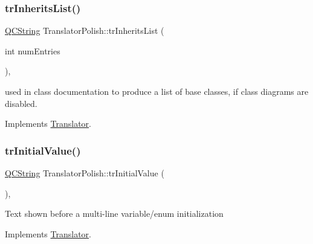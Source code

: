 \mbox{\label{class_translator_polish_a46060df2c96f771844d1228b29d893ce}} 
\subsubsection{\texorpdfstring{trInheritsList()}{trInheritsList()}}
{\footnotesize\ttfamily \mbox{\hyperlink{class_q_c_string}{Q\+C\+String}} Translator\+Polish\+::tr\+Inherits\+List (\begin{DoxyParamCaption}\item[{int}]{num\+Entries }\end{DoxyParamCaption})\hspace{0.3cm}{\ttfamily [inline]}, {\ttfamily [virtual]}}

used in class documentation to produce a list of base classes, if class diagrams are disabled. 

Implements \mbox{\hyperlink{class_translator}{Translator}}.

\mbox{\label{class_translator_polish_a675ae7842337be7efe61808e8a079ce8}} 
\subsubsection{\texorpdfstring{trInitialValue()}{trInitialValue()}}
{\footnotesize\ttfamily \mbox{\hyperlink{class_q_c_string}{Q\+C\+String}} Translator\+Polish\+::tr\+Initial\+Value (\begin{DoxyParamCaption}{ }\end{DoxyParamCaption})\hspace{0.3cm}{\ttfamily [inline]}, {\ttfamily [virtual]}}

Text shown before a multi-\/line variable/enum initialization 

Implements \mbox{\hyperlink{class_translator}{Translator}}.

\mbox{\label{class_translator_polish_a9e7ec9037ad79c76607b29fc953bc6e5}} 
